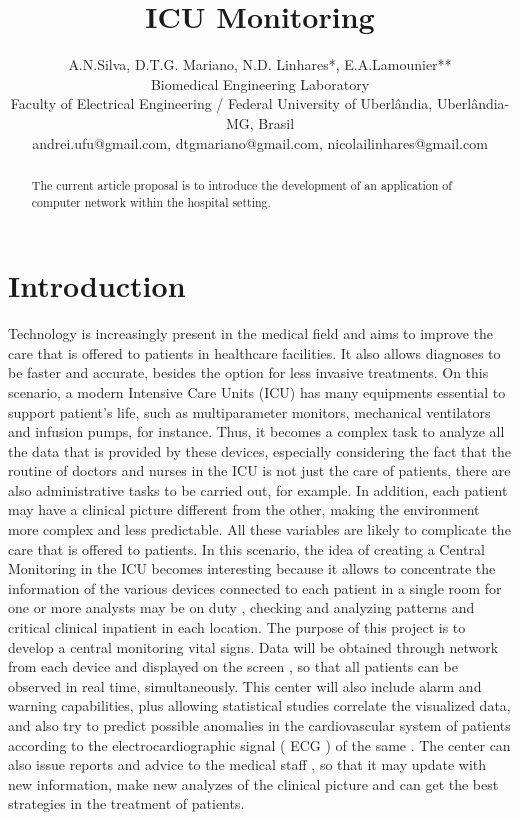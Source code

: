 \documentclass[a4paper,11pt]{article}
\title{ICU Monitoring }
\author{A.N.Silva, D.T.G. Mariano, N.D. Linhares*, E.A.Lamounier**\\Biomedical Engineering Laboratory\\ Faculty of Electrical Engineering / Federal University of Uberlândia, Uberlândia-MG, Brasil\\andrei.ufu@gmail.com, dtgmariano@gmail.com, nicolailinhares@gmail.com}
\begin{document}
\maketitle
\tableofcontents

\begin{abstract}
The current article proposal is to introduce the development of an application of computer network within the hospital setting.
\end{abstract}

\section{Introduction}

  Technology is increasingly present in the medical field and aims to improve the care that is offered to patients in healthcare facilities. It also allows diagnoses to be faster and accurate, besides the option for less invasive treatments. On this scenario, a modern Intensive Care Units (ICU) has many equipments essential to support patient's life, such as multiparameter monitors, mechanical ventilators and infusion pumps, for instance. 
  Thus, it becomes a complex task to analyze all the data that is provided by these devices, especially considering the fact that the routine of doctors and nurses in the ICU is not just the care of patients, there are also administrative tasks to be carried out, for example. In addition, each patient may have a clinical picture different from the other, making the environment more complex and less predictable. All these variables are likely to complicate the care that is offered to patients. In this scenario, the idea of ​​creating a Central Monitoring in the ICU becomes interesting because it allows to concentrate the information of the various devices connected to each patient in a single room for one or more analysts may be on duty , checking and analyzing patterns and critical clinical inpatient in each location.
  The purpose of this project is to develop a central monitoring vital signs. Data will be obtained through network from each device and displayed on the screen , so that all patients can be observed in real time, simultaneously. 
  This center will also include alarm and warning capabilities, plus allowing statistical studies correlate the visualized data, and also try to predict possible anomalies in the cardiovascular system of patients according to the electrocardiographic signal ( ECG ) of the same . The center can also issue reports and advice to the medical staff , so that it may update with new information, make new analyzes of the clinical picture and can get the best strategies in the treatment of patients.
\end{document}
